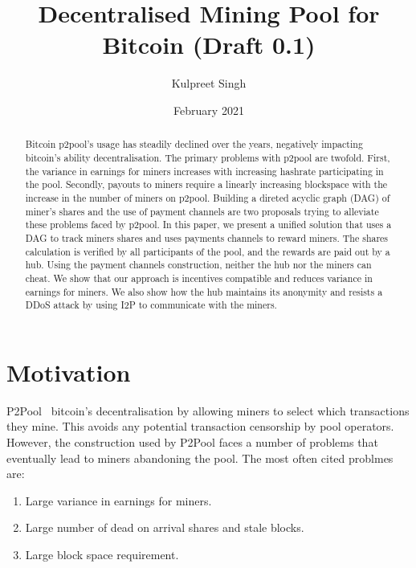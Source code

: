 \documentclass{article}
\title{Decentralised Mining Pool for Bitcoin (Draft 0.1)}
\author{Kulpreet Singh}
\date{February 2021}
\begin{document}
\maketitle

\begin{abstract}
  Bitcoin p2pool's usage has steadily declined over the years,
  negatively impacting bitcoin's ability decentralisation. The primary
  problems with p2pool are twofold. First, the variance in earnings
  for miners increases with increasing hashrate participating in the
  pool. Secondly, payouts to miners require a linearly increasing
  blockspace with the increase in the number of miners on
  p2pool. Building a direted acyclic graph (DAG) of miner's shares and
  the use of payment channels are two proposals trying to alleviate
  these problems faced by p2pool. In this paper, we present a unified
  solution that uses a DAG to track miners shares and uses payments
  channels to reward miners. The shares calculation is verified by all
  participants of the pool, and the rewards are paid out by a
  hub. Using the payment channels construction, neither the hub nor
  the miners can cheat. We show that our approach is incentives
  compatible and reduces variance in earnings for miners. We also show
  how the hub maintains its anonymity and resists a DDoS attack by
  using I2P to communicate with the miners.
\end{abstract}
   
\section{Motivation}

P2Pool~\cite{p2pool:wiki} bitcoin's decentralisation by allowing
miners to select which transactions they mine. This avoids any
potential transaction censorship by pool operators. However, the
construction used by P2Pool faces a number of problems that eventually
lead to miners abandoning the pool. The most often cited problmes are:

\begin{enumerate}
\item Large variance in earnings for miners.
\item Large number of dead on arrival shares and stale blocks.
\item Large block space requirement.
\end{enumerate}
\end{document}
